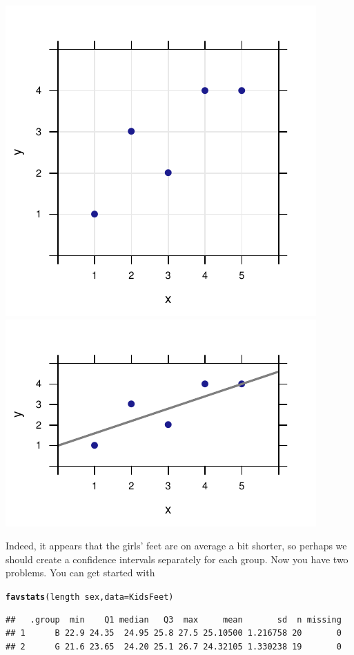 \documentclass[twoside]{book}\usepackage[]{graphicx}\usepackage[]{xcolor}
\makeatletter
\def\maxwidth{ %
  \ifdim\Gin@nat@width>\linewidth
    \linewidth
  \else
    \Gin@nat@width
  \fi
}
\newcommand{\hlopt}[1]{\textcolor[rgb]{0,0,0}{#1}}%
\newcommand{\hlstd}[1]{\textcolor[rgb]{0.345,0.345,0.345}{#1}}%
\newcommand{\hlkwc}[1]{\textcolor[rgb]{0.333,0.667,0.333}{#1}}%
\newcommand{\hlkwd}[1]{\textcolor[rgb]{0.737,0.353,0.396}{\textbf{#1}}}%
\newenvironment{kframe}{%
 \def\at@end@of@kframe{}%
 \ifinner\ifhmode%
  \def\at@end@of@kframe{\end{minipage}}%
  \begin{minipage}{\columnwidth}%
 \fi\fi%
 \def\FrameCommand##1{\hskip\@totalleftmargin \hskip-\fboxsep
 \colorbox{shadecolor}{##1}\hskip-\fboxsep
     \hskip-\linewidth \hskip-\@totalleftmargin \hskip\columnwidth}%
 \MakeFramed {\advance\hsize-\width
   \@totalleftmargin\z@ \linewidth\hsize
   \@setminipage}}%
 {\par\unskip\endMakeFramed%
 \at@end@of@kframe}
\newenvironment{knitrout}{}{} %
\makeatother
\begin{document}
\begin{solution}
\begin{knitrout}
{\centering \includegraphics[width=\maxwidth]{figures/fig-unnamed-chunk-158-1} 
\includegraphics[width=\maxwidth]{figures/fig-unnamed-chunk-158-2} 

}



\end{knitrout}
Indeed, it appears that the girls' feet are on average a bit shorter, so perhaps 
we should create a confidence intervals separately for each group.  Now you have two
problems.  You can get started with
\begin{knitrout}
\color{fgcolor}\begin{kframe}
\begin{alltt}
\hlkwd{favstats}\hlstd{(length} \hlopt{~} \hlstd{sex,} \hlkwc{data} \hlstd{= KidsFeet)}
\end{alltt}
\begin{verbatim}
##   .group  min    Q1 median   Q3  max     mean       sd  n missing
## 1      B 22.9 24.35  24.95 25.8 27.5 25.10500 1.216758 20       0
## 2      G 21.6 23.65  24.20 25.1 26.7 24.32105 1.330238 19       0
\end{verbatim}
\end{kframe}
\end{knitrout}

\end{solution}
\end{document}
